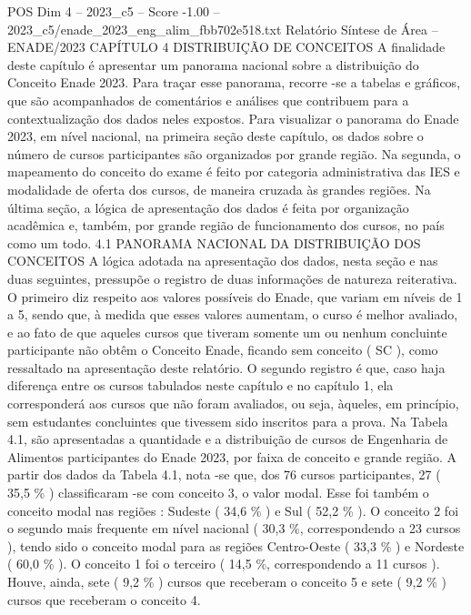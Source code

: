 \begin{textsample}{POS Dim 4 – 2023\_c5 – Score -1.00 – 2023\_c5/enade\_2023\_eng\_alim\_fbb702e518.txt}  \label{ex:f4_pos_278}
Relatório Síntese de Área – ENADE/2023 CAPÍTULO 4 DISTRIBUIÇÃO DE CONCEITOS A finalidade deste capítulo é apresentar um panorama nacional sobre a distribuição do Conceito Enade 2023.
Para traçar esse panorama, recorre -se a tabelas e gráficos, que são acompanhados de comentários e análises que contribuem para a contextualização dos dados neles expostos.
Para visualizar o panorama do Enade 2023, em nível nacional, na primeira seção deste capítulo, os dados sobre o número de cursos participantes são organizados por grande região.
Na segunda, o mapeamento do conceito do exame é feito por categoria administrativa das IES e modalidade de oferta dos cursos, de maneira cruzada às grandes regiões.
Na última seção, a lógica de apresentação dos dados é feita por organização acadêmica e, também, por grande região de funcionamento dos cursos, no país como um todo. 4.1 PANORAMA NACIONAL DA DISTRIBUIÇÃO DOS CONCEITOS A lógica adotada na apresentação dos dados, nesta seção e nas duas seguintes, pressupõe o registro de duas informações de natureza reiterativa.
O primeiro diz respeito aos valores possíveis do Enade, que variam em níveis de 1 a 5, sendo que, à medida que esses valores aumentam, o curso é melhor avaliado, e ao fato de que aqueles cursos que tiveram somente um ou nenhum concluinte participante não obtêm o Conceito Enade, ficando sem conceito ( SC ), como ressaltado na apresentação deste relatório.
O segundo registro é que, caso haja diferença entre os cursos tabulados neste capítulo e no capítulo 1, ela corresponderá aos cursos que não foram avaliados, ou seja, àqueles, em princípio, sem estudantes concluintes que tivessem sido inscritos para a prova.
Na Tabela 4.1, são apresentadas a quantidade e a distribuição de cursos de Engenharia de Alimentos participantes do Enade 2023, por faixa de conceito e grande região.
A partir dos dados da Tabela 4.1, nota -se que, dos 76 cursos participantes, 27 ( 35,5 \% ) classificaram -se com conceito 3, o valor modal.
Esse foi também o conceito modal nas regiões : Sudeste ( 34,6 \% ) e Sul ( 52,2 \% ).
O conceito 2 foi o segundo mais frequente em nível nacional ( 30,3 \%, correspondendo a 23 cursos ), tendo sido o conceito modal para as regiões Centro-Oeste ( 33,3 \% ) e Nordeste ( 60,0 \% ).
O conceito 1 foi o terceiro ( 14,5 \%, correspondendo a 11 cursos ).
Houve, ainda, sete ( 9,2 \% ) cursos que receberam o conceito 5 e sete ( 9,2 \% ) cursos que receberam o conceito 4.

\end{textsample}
